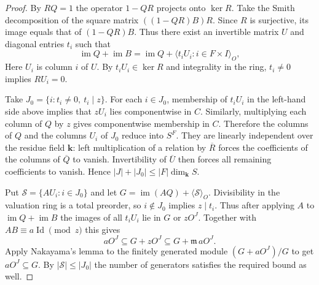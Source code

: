 \begin{proof}
By $RQ=1$ the operator $1-QR$ projects onto $\ker R$. Take the Smith decomposition of the square matrix $((1-QR)B)R$. Since $R$ is surjective, its image equals that of $(1-QR)B$. Thus there exist an invertible matrix $U$ and diagonal entries $t_i$ such that
\[
 \operatorname{im}Q+\operatorname{im}B
   =\operatorname{im}Q+\big\langle t_iU_i:i\in F\times I\big\rangle_O ,
\]
Here $U_i$ is column $i$ of $U$. By $t_iU_i\in\ker R$ and integrality in the ring, $t_i\ne0$ implies $RU_i=0$.

Take $J_0=\{i:t_i\ne0,\ t_i\mid z\}$. For each $i\in J_0$, membership of $t_iU_i$ in the left-hand side above implies that $zU_i$ lies componentwise in $C$. Similarly, multiplying each column of $Q$ by $z$ gives componentwise membership in $C$. Therefore the columns of $Q$ and the columns $U_i$ of $J_0$ reduce into $S^F$. They are linearly independent over the residue field $\mathbf k$: left multiplication of a relation by $\overline R$ forces the coefficients of the columns of $\overline Q$ to vanish. Invertibility of $\overline U$ then forces all remaining coefficients to vanish. Hence $|J|+|J_0|\le |F|\dim_\mathbf kS$.

Put $\mathcal S=\{AU_i:i\in J_0\}$ and let $G=\operatorname{im}(AQ)+\langle\mathcal S\rangle_O$. Divisibility in the valuation ring is a total preorder, so $i\notin J_0$ implies $z\mid t_i$. Thus after applying $A$ to $\operatorname{im}Q+\operatorname{im}B$ the images of all $t_iU_i$ lie in $G$ or $zO^J$. Together with $AB\equiv a\operatorname{Id}\pmod z$ this gives
\[
 aO^J\subseteq G+zO^J\subseteq G+\mathfrak m\,aO^J .
\]
Apply Nakayama's lemma to the finitely generated module $(G+aO^J)/G$ to get $aO^J\subseteq G$. By $|\mathcal S|\le|J_0|$ the number of generators satisfies the required bound as well.
\end{proof}

